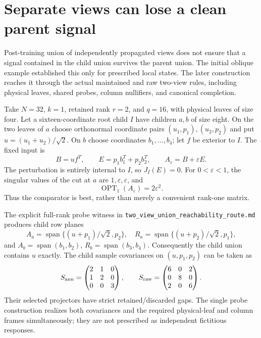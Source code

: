 \documentclass[11pt,oneside,openany,a4paper]{report}
\numberwithin{equation}{chapter}
\theoremstyle{definition}
\theoremstyle{remark}
\newcommand{\sourcefile}[1]{{\small\nolinkurl{#1}}}
\begin{document}
\section{Separate views can lose a clean parent signal}
\label{sec:later-separateviews}

Post-training union of independently propagated views does not ensure
that a signal contained in the child union survives the parent union.
The initial oblique example established this only for prescribed local
states.  The later construction reaches it through the actual
maintained and raw two-view rules, including physical leaves, shared
probes, column nullifiers, and canonical completion.

Take $N=32$, $k=1$, retained rank $r=2$, and $q=16$, with physical
leaves of size four.  Let a sixteen-coordinate root child $I$ have
children $a,b$ of size eight.  On the two leaves of $a$ choose
orthonormal coordinate pairs $(u_1,p_1),(u_2,p_2)$ and put
$u=(u_1+u_2)/\sqrt2$.  On $b$ choose coordinates $b_1,\ldots,b_4$;
let $f$ be exterior to $I$.  The fixed input is
\[
 B=uf^T,\qquad E=p_1b_1^T+p_2b_2^T,\qquad
 A_\varepsilon=B+\varepsilon E.
\]
The perturbation is entirely internal to $I$, so $J_I(E)=0$.
For $0<\varepsilon<1$, the singular values of the cut at $a$ are
$1,\varepsilon,\varepsilon$, and
\[
 \operatorname{OPT}_1(A_\varepsilon)=2\varepsilon^2.
\]
Thus the comparator is best, rather than merely a convenient rank-one
matrix.

The explicit full-rank probe witness in
\sourcefile{two_view_union_reachability_route.md} produces child row
planes
\[
 A_a=\operatorname{span}\{(u+p_1)/\sqrt2,p_2\},\quad
 R_a=\operatorname{span}\{(u+p_2)/\sqrt2,p_1\},
\]
and $A_b=\operatorname{span}(b_1,b_2)$,
$R_b=\operatorname{span}(b_3,b_4)$.  Consequently the child union
contains $u$ exactly.  The child sample covariances on
$(u,p_1,p_2)$ can be taken as
\[
 S_{\rm ann}=\begin{pmatrix}2&1&0\\1&2&0\\0&0&3\end{pmatrix},
 \qquad
 S_{\rm raw}=\begin{pmatrix}6&0&2\\0&8&0\\2&0&6\end{pmatrix}.
\]
Their selected projectors have strict retained/discarded gaps.  The
single probe construction realizes both covariances and the required
physical-leaf and column frames simultaneously; they are not prescribed
as independent fictitious responses.
\end{document}

